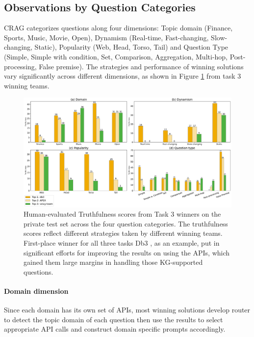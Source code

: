 \subsection{Observations by Question Categories}
 CRAG categorizes questions along four dimensions: Topic domain (Finance, Sports, Music, Movie, Open), Dynamism (Real-time, Fast-changing, Slow-changing, Static), Popularity (Web, Head, Torso, Tail) and Question Type (Simple, Simple with condition, Set, Comparison, Aggregation, Multi-hop, Post-processing, False premise). The strategies and performance of winning solutions vary significantly across different dimensions, as shown in Figure \ref{fig:question category} from task 3 winning teams. 

\begin{figure}[h!]
  \centering
  \includegraphics[width=16cm]{submissions/Xiao2024/figs/task_3_winner_slicing.pdf}
  \caption{Human-evaluated Truthfulness scores from Task 3 winners on the private test set across the four question categories. The truthfulness scores reflect different strategies taken by different winning teams. First-place winner for all three tasks Db3 \cite{db3}, as an example, put in significant efforts for improving the results on using the APIs, which gained them large margins in handling those KG-supported questions.}
  \label{fig:question category}
\end{figure}

\paragraph{Domain dimension} Since each domain has its own set of APIs, most winning solutions develop router to detect the topic domain of each question then use the results to select appropriate API calls and construct domain specific prompts accordingly. 

